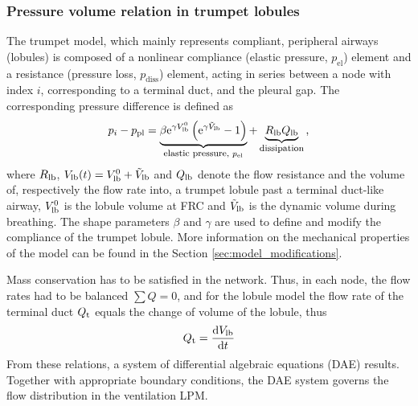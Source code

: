 \subsubsection{Pressure volume relation in trumpet lobules}
The trumpet model, which mainly represents compliant, peripheral airways (lobules) is composed of a nonlinear compliance (elastic pressure, $p_\mathrm{el}$) element and a resistance (pressure loss, $p_\mathrm{diss}$) element, acting in series between a node with index $i$, corresponding to a terminal duct, and the pleural gap.
The corresponding pressure difference is defined as
\begin{equation} \label{eqn:constitutiveLaw}
p_i - p_\mathrm{pl} = \underbrace{\beta\mathrm{e}^{\gamma V_\mathrm{lb}^0}\left(\mathrm{e}^{\gamma \tilde{V}_\mathrm{lb}} - 1\right)}_{\text{\footnotesize{elastic pressure, }} p_\mathrm{el}} + \underbrace{R_\mathrm{lb}Q_\mathrm{lb}}_\text{\footnotesize{dissipation}}\text{,}
\end{equation}
where $R_{\mathrm{lb}}$, $V_{\mathrm{lb}}(t) = V_{\mathrm{lb}}^0 + \tilde{V}_{\mathrm{lb}}$ and $Q_{\mathrm{lb}}$ denote the flow resistance and the volume of, respectively the flow rate into, a trumpet lobule past a terminal duct-like airway, $V_{\mathrm{lb}}^0$ is the lobule volume at FRC and $\tilde{V}_{\mathrm{lb}}$ is the dynamic volume during breathing.
The shape parameters $\beta$ and $\gamma$ are used to define and modify the compliance of the trumpet lobule.
More information on the mechanical properties of the model can be found in the Section \ref{sec:model_modifications}.

Mass conservation has to be satisfied in the network.
Thus, in each node, the flow rates had to be balanced $\sum Q = 0$, and for the lobule model the flow rate of the terminal duct $Q_{\mathrm{t}}$ equals the change of volume of the lobule, thus
\begin{equation}
  Q_{\mathrm{t}} = \frac{\mathrm{d} V_{\mathrm{lb}}}{\mathrm{d} t}
\end{equation}
From these relations, a system of differential algebraic equations (DAE) results.
Together with appropriate boundary conditions, the DAE system governs the flow distribution in the ventilation LPM.

